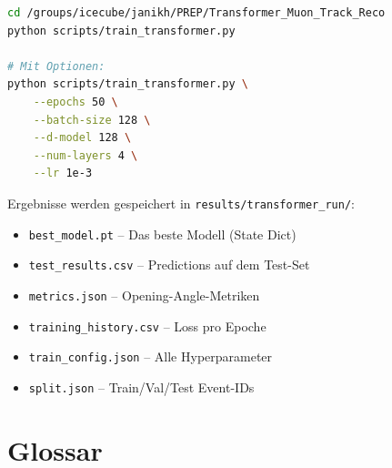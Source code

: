 \documentclass[12pt, a4paper]{article}
\begin{document}
\begin{lstlisting}[language=bash,caption={Training starten}]
cd /groups/icecube/janikh/PREP/Transformer_Muon_Track_Reco
python scripts/train_transformer.py

# Mit Optionen:
python scripts/train_transformer.py \
    --epochs 50 \
    --batch-size 128 \
    --d-model 128 \
    --num-layers 4 \
    --lr 1e-3
\end{lstlisting}

Ergebnisse werden gespeichert in \texttt{results/transformer\_run/}:
\begin{itemize}
    \item \texttt{best\_model.pt} -- Das beste Modell (State Dict)
    \item \texttt{test\_results.csv} -- Predictions auf dem Test-Set
    \item \texttt{metrics.json} -- Opening-Angle-Metriken
    \item \texttt{training\_history.csv} -- Loss pro Epoche
    \item \texttt{train\_config.json} -- Alle Hyperparameter
    \item \texttt{split.json} -- Train/Val/Test Event-IDs
\end{itemize}

\newpage
\section{Glossar}
\end{document}
